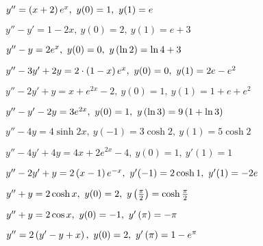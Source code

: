 	\begin{enumtasks}

		\label{bvp_green:green_lifting}
		\item \( y'' = \left( x + 2 \right) e^x, ~ y(0) = 1, ~ y(1) = e \) %
		\item \( y'' - y' = 1 - 2 x, ~ y(0) = 2, ~ y(1) = e + 3 \) %
		\item \( y'' - y = 2 e^x, ~ y(0) = 0, ~ y\left( \ln{2} \right) = \ln{4} + 3 \) %
		\item \( y'' - 3 y' + 2 y = 2 \cdot \left( 1 - x \right) e^x, ~ y(0) = 0, ~ y(1) = 2e - e^2 \) %
		\item \( y'' - 2 y' + y = x + e^{2x} - 2, ~ y(0) = 1, ~ y(1) = 1 + e + e^2 \) %
		\item \( y'' - y' - 2 y = 3 e^{2x}, ~ y(0) = 1, ~ y\left( \ln{3} \right) = 9 \left( 1 + \ln{3} \right) \) %
		\item \( y'' - 4 y = 4 \sinh{2 x}, ~ y(-1) = 3 \cosh{2}, ~ y(1) = 5 \cosh{2} \) %
		\item \( y'' - 4 y' + 4 y = 4 x + 2 e^{2x} - 4, ~ y(0) = 1, ~ y'(1) = 1 \) %
		\item \( y'' - 2 y' + y = 2 \left( x - 1 \right) e^{-x}, ~ y'(-1) = 2 \cosh{1}, ~ y'(1) = - 2 e \) %
		\item \( y'' + y = 2 \cosh{x}, ~ y(0) = 2, ~ y\left( \frac{\pi}{2} \right) = \cosh{\frac{\pi}{2}} \) %
		\item \( y'' + y = 2 \cos{x}, ~ y(0) = -1, ~ y'\left( \pi \right) = - \pi \) %
		\item \( y'' = 2 \left( y' - y + x \right), ~ y(0) = 2, ~ y'\left( \pi \right) = 1 - e^{\pi} \) %
		

\end{enumtasks}
